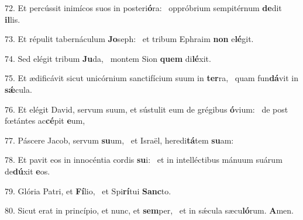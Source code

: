 72. Et percússit inimícos suos in posteri\textbf{ó}ra: \ast\  oppróbrium sempitérnum \textbf{de}dit \textbf{il}lis.\

73. Et répulit tabernáculum \textbf{Jo}seph: \ast\  et tribum Ephraim \textbf{non} e\textbf{lé}git.\

74. Sed elégit tribum \textbf{Ju}da, \ast\  montem Sion \textbf{quem} di\textbf{lé}xit.\

75. Et ædificávit sicut unicórnium sanctifícium suum in \textbf{ter}ra, \ast\  quam fun\textbf{dá}vit in \textbf{sǽ}cula.\

76. Et elégit David, servum suum, et sústulit eum de grégibus \textbf{ó}vium: \ast\  de post fœtántes ac\textbf{cé}pit \textbf{e}um,\

77. Páscere Jacob, servum \textbf{su}um, \ast\  et Israël, heredi\textbf{tá}tem \textbf{su}am:\

78. Et pavit eos in innocéntia cordis \textbf{su}i: \ast\  et in intelléctibus mánuum suárum de\textbf{dú}xit \textbf{e}os.\

79. Glória Patri, et \textbf{Fí}lio, \ast\  et Spi\textbf{rí}tui \textbf{Sanc}to.\

80. Sicut erat in princípio, et nunc, et \textbf{sem}per, \ast\  et in sǽcula sæcu\textbf{ló}rum. \textbf{A}men.\

